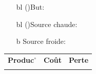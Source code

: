 \documentclass[a4paper, 10pt, final, garamond]{book}
\begin{document}
\begin{enumerate}[label=\sqenumi]
\begin{isd}[righthand ratio=.3]
\begin{isd}
			\begin{itemize}
				\item[bl](){But}: 
				\item[bl](){\color{red}Source chaude}: 
				\item[b]{\color{blue}Source froide}: 
			\end{itemize}
			\begin{tabularx}{\linewidth}{YYY}
				\textbf{Produc$^\circ$} &
				\textbf{Coût}           &
				\textbf{Perte}
				\\
				             &
				               &
			\end{tabularx}
			\tcblower
			\begin{center}
\end{center}
\end{isd}
\end{isd}
\end{enumerate}
\end{document}
